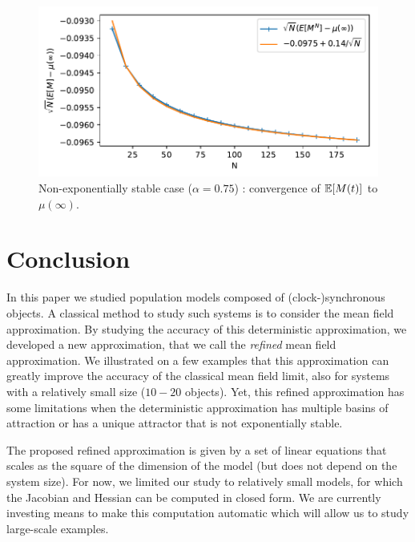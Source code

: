 \documentclass{amsart}
\begin{document}
\begin{figure}[ht]
  \centering
  \includegraphics[width=.8\linewidth]{unstable1D_steadyState}
  
  \caption{Non-exponentially stable case ($\alpha=0.75$) : convergence
    of $\esp{M(t)}$ to $\mu(\infty)$. }
  \label{fig:unstable_steadyState}
\end{figure}


\section{Conclusion}
\label{sec:conclusion}

In this paper we studied population models composed of
(clock-)synchronous objects. A classical method to study such systems
is to consider the mean field approximation. By studying the accuracy
of this deterministic approximation, we developed a new approximation,
that we call the \emph{refined} mean field approximation. We
illustrated on a few examples that this approximation can greatly
improve the accuracy of the classical mean field limit, also for
systems with a relatively small size ($10-20$ objects). Yet, this
refined approximation has some limitations when the deterministic
approximation has multiple basins of attraction or has a unique
attractor that is not exponentially stable.

The proposed refined approximation is given by a set of linear
equations that scales as the square of the dimension of the model (but
does not depend on the system size). For now, we limited our study to
relatively small models, for which the Jacobian and Hessian can be
computed in closed form. We are currently investing means to make this
computation automatic which will allow us to study large-scale
examples. 



\end{document}
